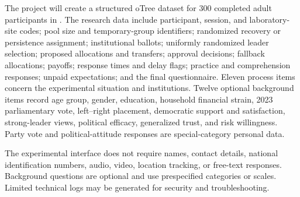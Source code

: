 


\small

The project will create a structured oTree dataset for 300 completed adult participants in . The research data include participant, session, and laboratory-site codes; pool size and temporary-group identifiers; randomized recovery or persistence assignment; institutional ballots; uniformly randomized leader selection; proposed allocations and transfers; approval decisions; fallback allocations; payoffs; response times and delay flags; practice and comprehension responses; unpaid expectations; and the final questionnaire. Eleven process items concern the experimental situation and institutions. Twelve optional background items record age group, gender, education, household financial strain, 2023 parliamentary vote, left--right placement, democratic support and satisfaction, strong-leader views, political efficacy, generalized trust, and risk willingness. Party vote and political-attitude responses are special-category personal data.

The experimental interface does not require names, contact details, national identification numbers, audio, video, location tracking, or free-text responses.  Background questions are optional and use prespecified categories or scales. Limited technical logs may be generated for security and troubleshooting.  

